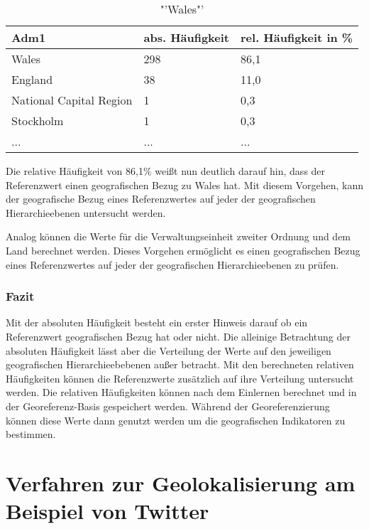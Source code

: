 			\begin{table}[h]
			\centering
			\caption{"'Wales"'}
			\label{tab:WalesVerw1}
			\begin{tabular}{|l|l|l|}
			\hline
			Adm1 & abs. Häufigkeit & rel. Häufigkeit in \% \\ \hline \hline
			Wales                   & 298 & 86,1 \\ \hline
			England                 & 38  & 11,0 \\ \hline
			National Capital Region & 1   & 0,3  \\ \hline
			Stockholm               & 1   & 0,3  \\ \hline
			... & ... & ... \\ \hline
			\end{tabular}
			\end{table}  

			Die relative Häufigkeit von 86,1\% weißt nun deutlich darauf hin, dass der Referenzwert einen geografischen Bezug zu Wales hat.
			Mit diesem Vorgehen, kann der geografische Bezug eines Referenzwertes auf jeder der geografischen Hierarchieebenen untersucht werden.

			Analog können die Werte für die Verwaltungseinheit zweiter Ordnung und dem Land berechnet werden.
			Dieses Vorgehen ermöglicht es einen geografischen Bezug eines Referenzwertes auf jeder der geografischen Hierarchieebenen zu prüfen.

		\subsubsection{Fazit}

			Mit der absoluten Häufigkeit besteht ein erster Hinweis darauf ob ein Referenzwert geografischen Bezug hat oder nicht.
			Die alleinige Betrachtung der absoluten Häufigkeit lässt aber die Verteilung der Werte auf den jeweiligen geografischen Hierarchieebebenen außer betracht.
			Mit den berechneten relativen Häufigkeiten können die Referenzwerte zusätzlich auf ihre Verteilung untersucht werden.
			Die relativen Häufigkeiten können nach dem Einlernen berechnet und in der Georeferenz-Basis gespeichert werden. 
			Während der Georeferenzierung können diese Werte dann genutzt werden um die geografischen Indikatoren zu bestimmen. 

	\section{Verfahren zur Geolokalisierung am Beispiel von Twitter}

